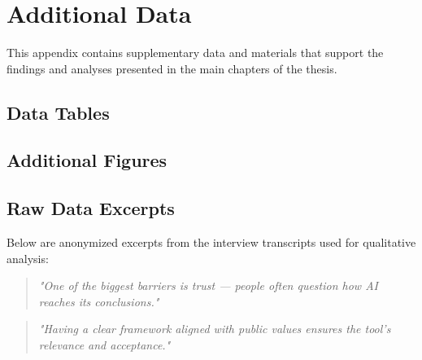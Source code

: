 
\chapter{Additional Data}\label{ch:additional-data}

This appendix contains supplementary data and materials that support the findings and analyses presented in the main chapters of the thesis.

\section*{Data Tables}



\vspace{2em}

\section*{Additional Figures}



\vspace{2em}

\section*{Raw Data Excerpts}

\noindent Below are anonymized excerpts from the interview transcripts used for qualitative analysis:

\begin{quote}
    \textit{"One of the biggest barriers is trust — people often question how AI reaches its conclusions."}
\end{quote}

\begin{quote}
    \textit{"Having a clear framework aligned with public values ensures the tool's relevance and acceptance."}
\end{quote}

\vspace{2em}

